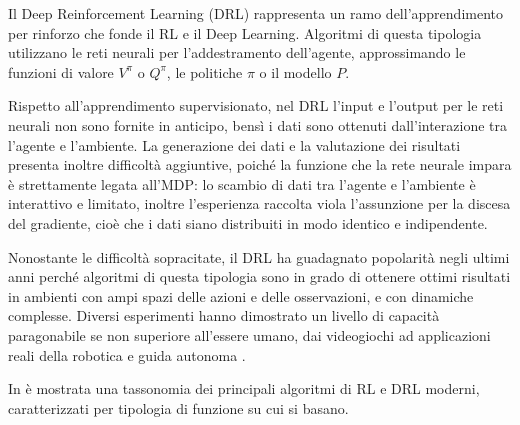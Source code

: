 Il Deep Reinforcement Learning (DRL) rappresenta un ramo dell'apprendimento per rinforzo che fonde il RL e il Deep Learning. Algoritmi di questa tipologia utilizzano le reti neurali per l'addestramento dell'agente, approssimando le funzioni di valore $V^\pi$ o $Q^\pi$, le politiche $\pi$ o il modello $P$.

Rispetto all'apprendimento supervisionato, nel DRL l'input e l'output per le reti neurali non sono fornite in anticipo, bensì i dati sono ottenuti dall'interazione tra l'agente e l'ambiente. La generazione dei dati e la valutazione dei risultati presenta inoltre difficoltà aggiuntive, poiché la funzione che la rete neurale impara è strettamente legata all'MDP: lo scambio di dati tra l'agente e l'ambiente è interattivo e limitato, inoltre l'esperienza raccolta viola l'assunzione per la discesa del gradiente, cioè che i dati siano distribuiti in modo identico e indipendente.

Nonostante le difficoltà sopracitate, il DRL ha guadagnato popolarità negli ultimi anni perché algoritmi di questa tipologia sono in grado di ottenere ottimi risultati in ambienti con ampi spazi delle azioni e delle osservazioni, e con dinamiche complesse. Diversi esperimenti hanno dimostrato un livello di capacità paragonabile se non superiore all'essere umano, dai videogiochi ad applicazioni reali della robotica e guida autonoma \cite{Mnih2015, Silver2017, Levine2016, Pan2017}.

In  è mostrata una tassonomia dei principali algoritmi di RL e DRL moderni, caratterizzati per tipologia di funzione su cui si basano.

